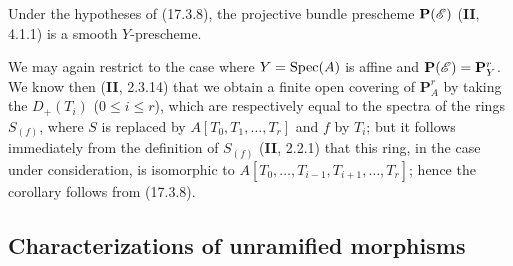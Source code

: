 \begin{corollary}[17.3.9]
\label{IV.17.3.9}
Under the hypotheses of \textup{(17.3.8)}, the projective bundle prescheme $\mathbf{P}(\mathscr{E})$ \textup{(\textbf{II}, 4.1.1)} is a smooth $Y$-prescheme.
\end{corollary}

We may again restrict to the case where $Y=\operatorname{Spec}(A)$ is affine and $\mathbf{P}(\mathscr{E})=\mathbf{P}^r_Y$. We know then (\textbf{II}, 2.3.14) that we obtain a finite open covering of $\mathbf{P}^r_A$ by taking the $D_+(T_i)$ ($0\leq i\leq r$), which are respectively equal to the spectra of the rings $S_{(f)}$, where $S$ is replaced by $A[T_0,T_1,\ldots,T_r]$ and $f$ by $T_i$; but it follows immediately from the definition of $S_{(f)}$ (\textbf{II}, 2.2.1) that this ring, in the case under consideration, is isomorphic to $A[T_0,\ldots,T_{i-1},T_{i+1},\ldots,T_r]$; hence the corollary follows from (17.3.8).


\subsection{Characterizations of unramified morphisms}

